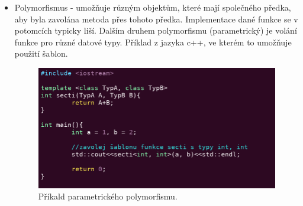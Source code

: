 \documentclass[main.tex]{subfiles}
\begin{document}
\begin{itemize}
	\item Polymorfismus - umožňuje různým objektům, které mají společného předka, aby byla zavolána metoda přes tohoto předka. Implementace dané funkce se v potomcích typicky liší.
		Dalším druhem polymorfismu (parametrický) je volání funkce pro různé datové typy. Příklad z jazyka c++, ve kterém to umožňuje použití šablon.
		\begin{figure}[h]
			\centering
			\includegraphics[width=.8\textwidth]{./images/oop/prototype.png}
			\caption{Příkald parametrického polymorfismu.}
		\end{figure}
	\cite{web:wik:en:oop}
\end{itemize}
\end{document}
